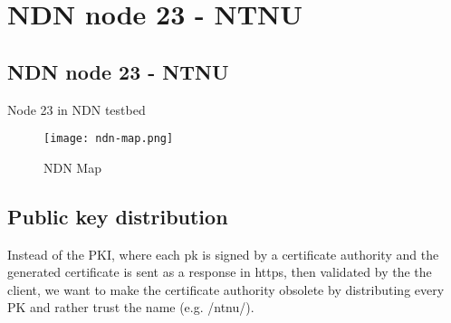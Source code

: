 \chapter{NDN node 23 - NTNU}\label{chp4:} 

\section{NDN node 23 - NTNU}
Node 23 in NDN testbed

\begin{figure}[ht]
  \centering
  \texttt{[image: ndn-map.png]}
  \caption{NDN Map}
  \label{fig:ndn-map}
\end{figure}

\section{Public key distribution}
Instead of the PKI, where each pk is signed by a certificate authority and the generated certificate is sent as a response in https, then validated by the the client, we want to make the certificate authority obsolete by distributing every PK and rather trust the name (e.g. /ntnu/). 
